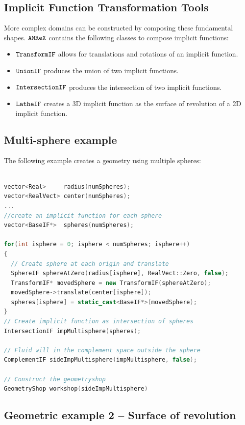\subsection{Implicit Function Transformation Tools}

More complex domains can be constructed by composing these fundamental shapes.
$\tt{AMReX}$ contains the following classes to compose implicit functions:
\begin{itemize}
\item $\tt{TransformIF}$    allows for translations and rotations of an implicit function.
\item $\tt{UnionIF}$        produces the union of two implicit functions.  
\item $\tt{IntersectionIF}$ produces the intersection of two implicit functions.
\item $\tt{LatheIF}$        creates a 3D implicit function as the surface of
  revolution of a 2D implicit function.
\end{itemize}

\subsection{Multi-sphere example}
The following example creates a geometry using multiple spheres:

\begin{lstlisting}[language=cpp]

vector<Real>     radius(numSpheres);
vector<RealVect> center(numSpheres);
...
//create an implicit function for each sphere
vector<BaseIF*>  spheres(numSpheres);

for(int isphere = 0; isphere < numSpheres; isphere++)
{
  // Create sphere at each origin and translate
  SphereIF sphereAtZero(radius[isphere], RealVect::Zero, false);
  TransformIF* movedSphere = new TransformIF(sphereAtZero);
  movedSphere->translate(center[isphere]);
  spheres[isphere] = static_cast<BaseIF*>(movedSphere);
}
// Create implicit function as intersection of spheres
IntersectionIF impMultisphere(spheres);

// Fluid will in the complement space outside the sphere
ComplementIF sideImpMultisphere(impMultisphere, false);

// Construct the geometryshop
GeometryShop workshop(sideImpMultisphere)
\end{lstlisting}

\subsection{Geometric example 2 -- Surface of revolution}

